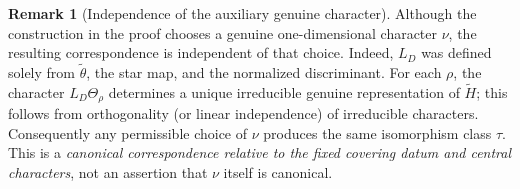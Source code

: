 \documentclass[11pt]{article}
\newcommand{\tH}{\widetilde H}
\theoremstyle{plain}
\theoremstyle{definition}
\newtheorem{remark}[theorem]{Remark}
\begin{document}
\begin{remark}[Independence of the auxiliary genuine character]
Although the construction in the proof chooses a genuine
one-dimensional character $\nu$, the resulting correspondence is
independent of that choice. Indeed, $L_D$ was defined solely from
$\widetilde\theta$, the star map, and the normalized discriminant.
For each $\rho$, the character $L_D\Theta_\rho$ determines a unique
irreducible genuine representation of $\tH$; this follows from
orthogonality (or linear independence) of irreducible characters.
Consequently any permissible choice of $\nu$ produces the same
isomorphism class $\tau$. This is a \emph{canonical correspondence
relative to the fixed covering datum and central characters}, not
an assertion that $\nu$ itself is canonical.
\end{remark}
\end{document}
